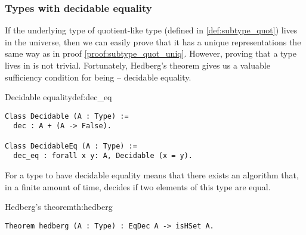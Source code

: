 \subsubsection{Types with decidable equality}
If the underlying type of quotient-like type (defined in \ref{def:subtype_quot}) lives in the  universe, then we can easily prove that it has a unique representations the same way as in proof \ref{proof:subtype_quot_uniq}. However, proving that a type lives in  is not trivial. Fortunately, Hedberg's theorem \cite{hedberg_1998} gives us a valuable sufficiency condition for being  -- decidable equality.
\begin{defi}{Decidable equality}{def:dec_eq}
\begin{verbatim}
Class Decidable (A : Type) :=
  dec : A + (A -> False).
  
Class DecidableEq (A : Type) :=
  dec_eq : forall x y: A, Decidable (x = y).
\end{verbatim}
\end{defi}
For a type to have decidable equality means that there exists an algorithm that, in a finite amount of time, decides if two elements of this type are equal.
\begin{theo}{Hedberg's theorem}{th:hedberg}
\begin{verbatim}
Theorem hedberg (A : Type) : EqDec A -> isHSet A.
\end{verbatim}
\end{theo}
